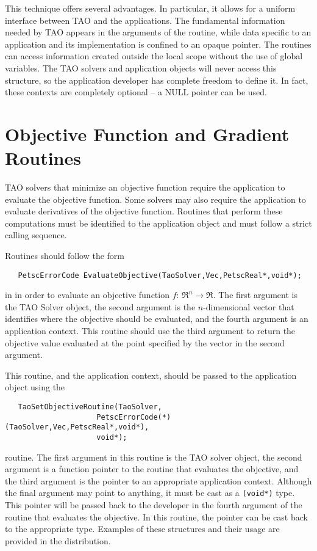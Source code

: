 This technique offers several advantages.
In particular, it allows for a uniform interface between TAO and 
the applications.   The fundamental information needed by TAO 
appears in the arguments of the routine, while data specific to an application
and its implementation is confined to an opaque pointer.
The routines can access information created outside the 
local scope without the use of global variables.
The TAO solvers and application objects will never access this structure, 
so the application developer has complete freedom to define it.  In fact,
these contexts are completely optional -- a NULL pointer can be used.



\section{Objective Function and Gradient Routines}\label{sec:fghj}

TAO solvers that minimize an objective function require
the application to evaluate the objective function.  Some solvers
may also require the application to evaluate
derivatives of the objective function.  
Routines that perform these computations must be identified
to the application object and must follow a strict calling sequence.

Routines should follow the form
\begin{verbatim}
   PetscErrorCode EvaluateObjective(TaoSolver,Vec,PetscReal*,void*);
\end{verbatim}
in in order to evaluate an objective function $f: \, \Re^n \to \Re$. 
The first argument is the TAO Solver object, the second argument is the
$n$-dimensional vector that identifies where the objective should be evaluated, 
and the fourth argument is an application context.
This routine should use the third argument to return the objective value 
evaluated at the point
specified by the vector in the second argument.

This routine, and the application context, should be passed to the 
application object using
the  
\begin{verbatim}
   TaoSetObjectiveRoutine(TaoSolver,
                     PetscErrorCode(*)(TaoSolver,Vec,PetscReal*,void*),
                     void*);
\end{verbatim}
routine. 
The first argument in this routine is the TAO solver object, 
the second argument is a function pointer to the routine that 
evaluates the objective, and the third
argument is the pointer to an appropriate application context.  
Although the final argument may point to anything, it must be cast as a {\tt (void*)} type.
This pointer will be passed back to the developer in the fourth argument of the
routine that evaluates the objective.  In this routine, the pointer can be cast
back to the appropriate type.  Examples of these structures and their 
usage are provided in the distribution.

